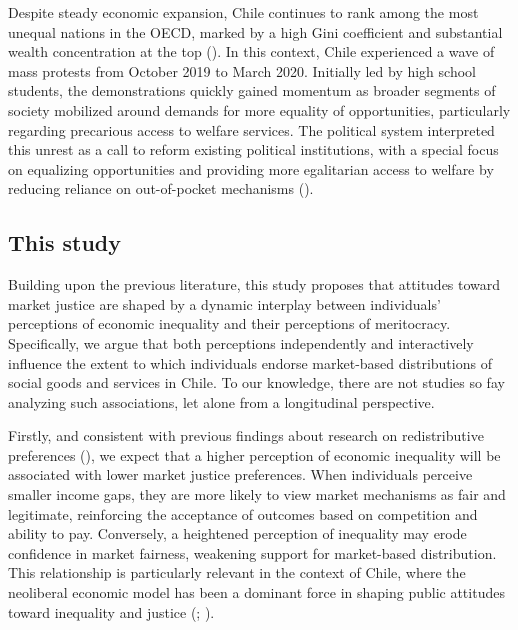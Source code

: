 \documentclass[
  12pt,
]{article}
\begin{document}
Despite steady economic expansion, Chile continues to rank among the
most unequal nations in the OECD, marked by a high Gini coefficient and
substantial wealth concentration at the top
(). In this context,
Chile experienced a wave of mass protests from October 2019 to March
2020. Initially led by high school students, the demonstrations quickly
gained momentum as broader segments of society mobilized around demands
for more equality of opportunities, particularly regarding precarious
access to welfare services. The political system interpreted this unrest
as a call to reform existing political institutions, with a special
focus on equalizing opportunities and providing more egalitarian access
to welfare by reducing reliance on out-of-pocket mechanisms
().

\subsection{This study}\label{this-study}

Building upon the previous literature, this study proposes that
attitudes toward market justice are shaped by a dynamic interplay
between individuals' perceptions of economic inequality and their
perceptions of meritocracy. Specifically, we argue that both perceptions
independently and interactively influence the extent to which
individuals endorse market-based distributions of social goods and
services in Chile. To our knowledge, there are not studies so fay
analyzing such associations, let alone from a longitudinal perspective.

Firstly, and consistent with previous findings about research on
redistributive preferences
(), we
expect that a higher perception of economic inequality will be
associated with lower market justice preferences. When individuals
perceive smaller income gaps, they are more likely to view market
mechanisms as fair and legitimate, reinforcing the acceptance of
outcomes based on competition and ability to pay. Conversely, a
heightened perception of inequality may erode confidence in market
fairness, weakening support for market-based distribution. This
relationship is particularly relevant in the context of Chile, where the
neoliberal economic model has been a dominant force in shaping public
attitudes toward inequality and justice
(;
).
\end{document}
